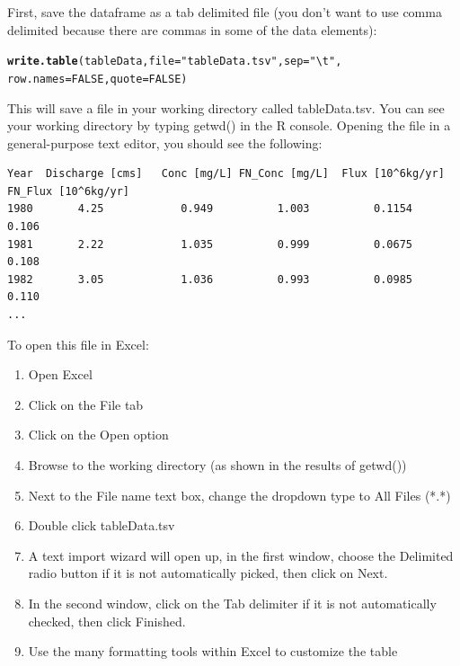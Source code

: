 \documentclass[a4paper,11pt]{article}\usepackage[]{graphicx}\usepackage[]{color}
\makeatletter
\newcommand{\hlnum}[1]{\textcolor[rgb]{0.686,0.059,0.569}{#1}}%
\newcommand{\hlstr}[1]{\textcolor[rgb]{0.192,0.494,0.8}{#1}}%
\newcommand{\hlstd}[1]{\textcolor[rgb]{0.345,0.345,0.345}{#1}}%
\newcommand{\hlkwc}[1]{\textcolor[rgb]{0.333,0.667,0.333}{#1}}%
\newcommand{\hlkwd}[1]{\textcolor[rgb]{0.737,0.353,0.396}{\textbf{#1}}}%
\newenvironment{kframe}{%
 \def\at@end@of@kframe{}%
 \ifinner\ifhmode%
  \def\at@end@of@kframe{\end{minipage}}%
  \begin{minipage}{\columnwidth}%
 \fi\fi%
 \def\FrameCommand##1{\hskip\@totalleftmargin \hskip-\fboxsep
 \colorbox{shadecolor}{##1}\hskip-\fboxsep
     \hskip-\linewidth \hskip-\@totalleftmargin \hskip\columnwidth}%
 \MakeFramed {\advance\hsize-\width
   \@totalleftmargin\z@ \linewidth\hsize
   \@setminipage}}%
 {\par\unskip\endMakeFramed%
 \at@end@of@kframe}
\newenvironment{knitrout}{}{} %
\makeatother
\begin{document}
First, save the dataframe as a tab delimited file (you don't want to use comma delimited because there are commas in some of the data elements):


\begin{knitrout}
\color{fgcolor}\begin{kframe}
\begin{alltt}
\hlkwd{write.table}\hlstd{(tableData,} \hlkwc{file}\hlstd{=}\hlstr{"tableData.tsv"}\hlstd{,}\hlkwc{sep}\hlstd{=}\hlstr{"\textbackslash{}t"}\hlstd{,}
            \hlkwc{row.names} \hlstd{=} \hlnum{FALSE}\hlstd{,}\hlkwc{quote}\hlstd{=}\hlnum{FALSE}\hlstd{)}
\end{alltt}
\end{kframe}
\end{knitrout}


This will save a file in your working directory called tableData.tsv.  You can see your working directory by typing getwd() in the R console. Opening the file in a general-purpose text editor, you should see the following:

\begingroup
    \fontsize{8pt}{10pt}
\begin{verbatim}
Year  Discharge [cms]	Conc [mg/L]	FN_Conc [mg/L]	Flux [10^6kg/yr]	FN_Flux [10^6kg/yr]
1980	   4.25	           0.949	      1.003	         0.1154	            0.106  
1981	   2.22	           1.035	      0.999	         0.0675	            0.108 
1982	   3.05	           1.036	      0.993	         0.0985	            0.110 
...
\end{verbatim}
\endgroup

To open this file in Excel:
\begin{enumerate}
\item Open Excel
\item Click on the File tab
\item Click on the Open option
\item Browse to the working directory (as shown in the results of getwd())
\item Next to the File name text box, change the dropdown type to All Files (*.*)
\item Double click tableData.tsv
\item A text import wizard will open up, in the first window, choose the Delimited radio button if it is not automatically picked, then click on Next.
\item In the second window, click on the Tab delimiter if it is not automatically checked, then click Finished.
\item Use the many formatting tools within Excel to customize the table
\end{enumerate}
\end{document}
